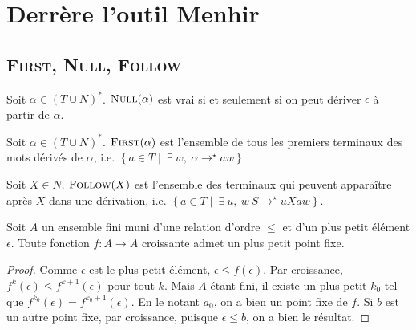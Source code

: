 \documentclass{cours}
\begin{document}
\section{Derrère l'outil Menhir}
\subsection{\textsc{First, Null, Follow}}
\begin{definition}
    Soit $\alpha \in (T \cup N)^{*}$. $\textsc{Null}(\alpha)$ est vrai si et seulement si on peut dériver $\epsilon$ à partir de $\alpha$.
\end{definition}
\begin{definition}
    Soit $\alpha \in (T \cup N)^{*}$. $\textsc{First}(\alpha)$ est l'ensemble de tous les premiers terminaux des mots dérivés de $\alpha$, i.e. $\left\{a \in T \mid\ \exists \ w, \ \alpha \rightarrow^{\star} aw\right\}$
\end{definition}
\begin{definition}
    Soit $X \in N$. $\textsc{Follow}(X)$ est l'ensemble des terminaux qui peuvent apparaître après $X$ dans une dérivation, i.e. 
    $\left\{a \in T \mid\ \exists \ u,\ w \ S \rightarrow^{\star} uXaw \right\}$.
\end{definition}

\begin{theorem}[Tarski]
    Soit $A$ un ensemble fini muni d'une relation d'ordre $\leq$ et d'un plus petit élément $\epsilon$. Toute fonction $f : A \rightarrow A$ croissante admet un plus petit point fixe. 
\end{theorem}
\begin{proof}
    Comme $\epsilon$ est le plus petit élément, $\epsilon \leq f(\epsilon)$. Par croissance, $f^{k}(\epsilon) \leq f^{k+1}(\epsilon)$ pour tout $k$. Mais $A$ étant fini, il existe un plus petit $k_{0}$ tel que $f^{k_{0}}(\epsilon) = f^{k_{0} + 1}(\epsilon)$. En le notant $a_{0}$, on a bien un point fixe de $f$. Si $b$ est un autre point fixe, par croissance, puisque $\epsilon \leq b$, on a bien le résultat. 
\end{proof}
\end{document}
